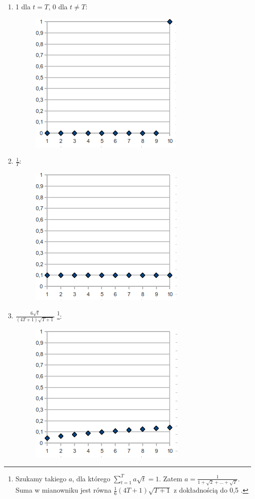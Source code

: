 \documentclass[12pt, a4paper]{article}
\begin{document}
\begin{enumerate}
 \item 1 dla $t=T$, 0 dla $t \neq T$:
  \begin{figure}[H]
  \centering
  \includegraphics[scale=0.5]{img/1.png} 
  \end{figure}
 \item $\frac{1}{T}$:
  \begin{figure}[H]
  \centering
  \includegraphics[scale=0.5]{img/2.png} 
  \end{figure}
 \item $\frac{6\sqrt{t}}{(4T+1)\sqrt{T+1}}$
\footnote{Szukamy takiego $a$, dla którego $\sum\limits_{t=1}^T a\sqrt{t} = 1$. Zatem $a = \frac{1}{1 + \sqrt{2} + \dots + \sqrt{T}}$. 
Suma w mianowniku jest równa $\frac{1}{6}(4T+1)\sqrt{T+1}$ z dokładnością do 0,5 \cite{snehal}.}:
  \begin{figure}[H]
  \centering
  \includegraphics[scale=0.5]{img/3.png} 

\end{figure}
\end{enumerate}
\end{document}
